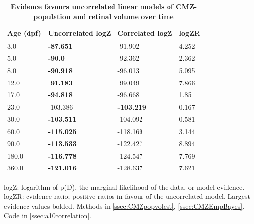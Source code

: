 \documentclass{ut-thesis}
\begin{document}
\begin{NoHyper}
\begin{table}[!ht]
    \centering
    \caption{{\bf Evidence favours uncorrelated linear models of CMZ-population and retinal volume over time}}
    \begin{tabular}{|l|l|l|l|}
        \hline
        {\bf Age (dpf)} & {\bf Uncorrelated logZ} & {\bf Correlated logZ} & {\bf logZR}\\ \hline
        3.0 & {\bf -87.651} & -91.902 & 4.252\\ \hline
        5.0 & {\bf -90.0} & -92.362 & 2.362\\ \hline
        8.0 & {\bf -90.918} & -96.013 & 5.095\\ \hline
        12.0 & {\bf -91.183} & -99.049 & 7.866\\ \hline
        17.0 & {\bf -94.818} & -96.668 & 1.85\\ \hline
        23.0 & -103.386 & {\bf -103.219} & 0.167\\ \hline
        30.0 & {\bf -103.511} & -104.092 & 0.581\\ \hline
        60.0 & {\bf -115.025} & -118.169 & 3.144\\ \hline
        90.0 & {\bf -113.533} & -122.427 & 8.894\\ \hline
        180.0 & {\bf -116.778} & -124.547 & 7.769\\ \hline
        360.0 & {\bf -121.016} & -128.637 & 7.621\\ \hline
        \end{tabular}
    \begin{flushleft} logZ: logarithm of p(D), the marginal likelihood of the data, or model evidence. logZR: evidence ratio; positive ratios in favour of the uncorrelated model. Largest evidence values bolded.
    Methods in \autoref{ssec:CMZpopvolest}, \autoref{ssec:CMZEmpBayes}.
    Code in \autoref{ssec:a10correlation}.

    \end{flushleft}
    \label{corrtable}
\end{table}


\end{NoHyper}
\end{document}
